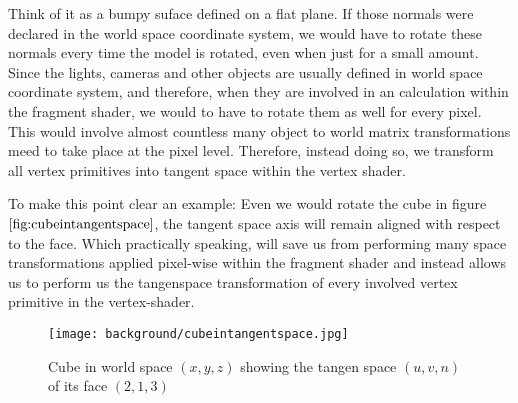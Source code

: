Think of it as a bumpy suface defined on a flat plane. If those normals were declared in the world space coordinate system, we would have to rotate these normals every time the model is rotated, even when just for a small amount. Since the lights, cameras and other objects are usually defined in world space coordinate system, and therefore, when they are involved in an calculation within the fragment shader, we would to have to rotate them as well for every pixel. This would involve almost countless many object to world matrix transformations meed to take place at the pixel level. Therefore, instead doing so, we transform all vertex primitives into tangent space within the vertex shader. 

To make this point clear an example: Even we would rotate the cube in figure $\ref{fig:cubeintangentspace}$, the tangent space axis will remain aligned with respect to the face. Which practically speaking, will save us from performing many space transformations applied pixel-wise within the fragment shader and instead allows us to perform us the tangenspace transformation of every involved vertex primitive in the vertex-shader.

\begin{figure}[H]
  \centering
  \texttt{[image: background/cubeintangentspace.jpg]}
  \caption{Cube in world space $(x,y,z)$ showing the tangen space $(u,v,n)$ of its face $(2,1,3)$}
  \label{fig:cubeintangentspace}
\end{figure}










